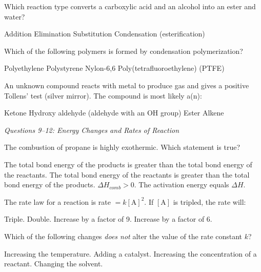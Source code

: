 \documentclass[addpoints]{exam}
\begin{document}
\begin{questions}
\question[1] Which reaction type converts a carboxylic acid and an alcohol into an ester
and water?
\begin{choices}
    \choice Addition
    \choice Elimination
    \choice Substitution
    \correctchoice Condensation (esterification)
\end{choices}

\question[1] Which of the following polymers is formed by condensation polymerization?
\begin{choices}
    \choice Polyethylene
    \choice Polystyrene
    \correctchoice Nylon-6,6
    \choice Poly(tetrafluoroethylene) (PTFE)
\end{choices}

\question[1] An unknown compound reacts with  metal to produce  gas and gives
a positive Tollens' test (silver mirror). The compound is most likely a(n):
\begin{choices}
    \choice Ketone
    \correctchoice Hydroxy aldehyde (aldehyde with an OH group)
    \choice Ester
    \choice Alkene
\end{choices}

\vspace{3mm}
\noindent\textit{Questions 9--12: Energy Changes and Rates of Reaction}
\vspace{3mm}

\question[1] The combustion of propane is highly exothermic. Which statement is true?
\begin{choices}
    \correctchoice The total bond energy of the products is greater than the total bond
    energy of the reactants.
    \choice The total bond energy of the reactants is greater than the total bond energy
    of the products.
    \choice $\Delta H_{comb} > 0$.
    \choice The activation energy equals $\Delta H$.
\end{choices}

\question[1] The rate law for a reaction is rate $= k[\text{A}]^2$. If $[\text{A}]$ is
tripled, the rate will:
\begin{choices}
    \choice Triple.
    \choice Double.
    \correctchoice Increase by a factor of 9.
    \choice Increase by a factor of 6.
\end{choices}

\question[1] Which of the following changes \textit{does not} alter the value of the rate
constant $k$?
\begin{choices}
    \choice Increasing the temperature.
    \choice Adding a catalyst.
    \correctchoice Increasing the concentration of a reactant.
    \choice Changing the solvent.
\end{choices}


\end{questions}
\end{document}
